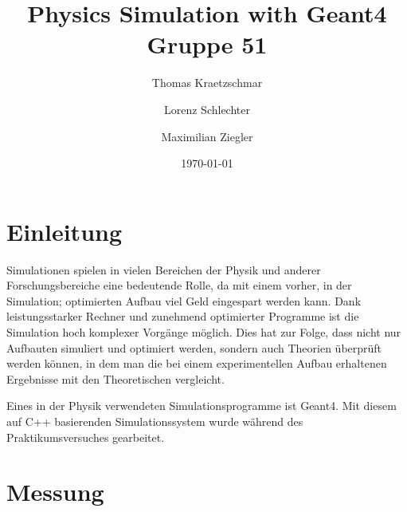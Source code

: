 \documentclass[a4paper,11pt,twoside]{article}
\title{%
{\Huge Physics Simulation with Geant4}\\[0.5\baselineskip]
{\normalsize Gruppe 51}
}
\author{%
Thomas Kraetzschmar
\and Lorenz Schlechter
\and Maximilian Ziegler
}
\date{\today}
\begin{document}
\pagestyle{fancy}
\maketitle
\clearpage
\tableofcontents
\clearpage
\pagestyle{fancy}
\section{Einleitung}
Simulationen spielen in vielen Bereichen der Physik und anderer Forschungsbereiche eine bedeutende Rolle, da mit einem vorher, in der Simulation; optimierten Aufbau viel Geld eingespart werden kann. Dank leistungsstarker Rechner und zunehmend optimierter Programme ist die Simulation hoch komplexer Vorgänge möglich. Dies hat zur Folge, dass nicht nur Aufbauten simuliert und optimiert werden, sondern auch Theorien überprüft werden können, in dem man die bei einem experimentellen Aufbau erhaltenen Ergebnisse mit den Theoretischen vergleicht.

Eines in der Physik verwendeten Simulationsprogramme ist Geant4. Mit diesem auf C++ basierenden Simulationssystem wurde während des Praktikumsversuches gearbeitet.

\section{Messung}
\end{document}
